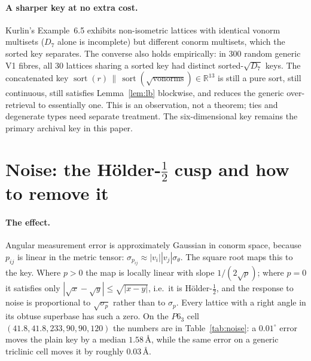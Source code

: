 \documentclass[11pt]{article}
\newcommand{\Ang}{\text{\AA}}
\begin{document}
\paragraph{A sharper key at no extra cost.}
Kurlin's Example~6.5 exhibits non-isometric lattices with identical vonorm multisets ($D_7$ alone is incomplete) but different conorm multisets, which the sorted key separates. The converse also holds empirically: in 300 random generic V1 fibres, all 30 lattices sharing a sorted key had distinct sorted-$\sqrt{D_7}$ keys. The concatenated key $\operatorname{sort}(r)\,\|\,\operatorname{sort}(\sqrt{\text{vonorms}})\in\mathbb R^{13}$ is still a pure sort, still continuous, still satisfies Lemma~\ref{lem:lb} blockwise, and reduces the generic over-retrieval to essentially one. This is an observation, not a theorem; ties and degenerate types need separate treatment. The six-dimensional key remains the primary archival key in this paper.

\section{Noise: the H\"older-$\tfrac12$ cusp and how to remove it}
\label{app:noise}

\paragraph{The effect.}
Angular measurement error is approximately Gaussian in conorm space, because $p_{ij}$ is linear in the metric tensor: $\sigma_{p_{ij}}\approx|v_i||v_j|\sigma_\theta$. The square root maps this to the key. Where $p>0$ the map is locally linear with slope $1/(2\sqrt p)$; where $p=0$ it satisfies only $|\sqrt x-\sqrt y|\le\sqrt{|x-y|}$, i.e.\ it is H\"older-$\tfrac12$, and the response to noise is proportional to $\sqrt{\sigma_p}$ rather than to $\sigma_p$. Every lattice with a right angle in its obtuse superbase has such a zero. On the $P6_3$ cell $(41.8,41.8,233,90,90,120)$ the numbers are in Table~\ref{tab:noise}: a $0.01^\circ$ error moves the plain key by a median $1.58\,\Ang$, while the same error on a generic triclinic cell moves it by roughly $0.03\,\Ang$.
\end{document}
